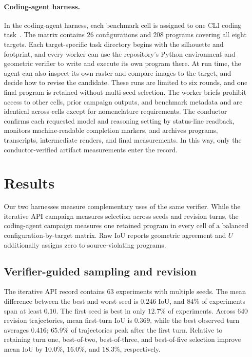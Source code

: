 \documentclass[%
 reprint,
 superscriptaddress,
 amsmath,amssymb,
 aps,
 pra,
 longbibliography,
 floatfix,
]{revtex4-2}
\begin{document}
\paragraph{Coding-agent harness.}\label{sec:agentsetup}

In the coding-agent harness, each benchmark cell is assigned to one CLI
coding task~\cite{claudecode,codexcli}. The matrix contains 26 configurations
and 208 programs covering all eight targets. Each target-specific task
directory begins with the silhouette and footprint, and every worker can use
the repository's Python environment and geometric verifier to write and
execute its own program there. At run time, the agent can also inspect its
own raster and compare images to the target, and decide how to revise the
candidate. These runs are limited to six rounds, and one final program is
retained without multi-seed selection. The worker briefs prohibit access to
other cells, prior campaign outputs, and benchmark metadata and are identical
across cells except for nomenclature requirements. The conductor confirms
each requested model and reasoning setting by status-line readback, monitors
machine-readable completion markers, and archives programs, transcripts,
intermediate renders, and final measurements. In this way, only the
conductor-verified artifact measurements enter the record.

\section{Results}\label{sec:results}

Our two harnesses measure complementary uses of the same verifier. While the
iterative API campaign measures selection across seeds and revision turns,
the coding-agent campaign measures one retained program in every cell of a
balanced configuration-by-target matrix. Raw IoU reports geometric agreement
and $U$ additionally assigns zero to source-violating programs.

\subsection{Verifier-guided sampling and revision}\label{sec:june}

The iterative API record contains 63 experiments with multiple seeds. The
mean difference between the best and worst seed is $0.246$ IoU, and $84\%$
of experiments span at least $0.10$. The first seed is best in only
$12.7\%$ of experiments. Across 640 revision trajectories, mean first-turn
IoU is $0.369$, while the best observed turn averages $0.416$; $65.9\%$ of
trajectories peak after the first turn. Relative to retaining turn one,
best-of-two, best-of-three, and best-of-five selection improve mean IoU by
$10.0\%$, $16.0\%$, and $18.3\%$, respectively.
\end{document}
